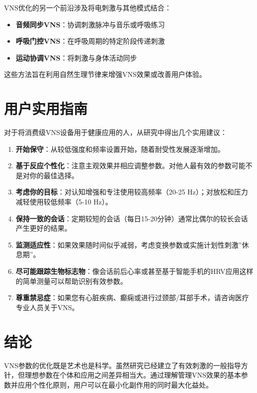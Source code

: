 \documentclass[
  Letterpaper,
]{scrbook}
\providecommand{\tightlist}{%
  \setlength{\itemsep}{0pt}\setlength{\parskip}{0pt}}\usepackage{longtable,booktabs,array}
\begin{document}
VNS优化的另一个前沿涉及将电刺激与其他模式结合：

\begin{itemize}
\tightlist
\item
  \textbf{音频同步VNS}：协调刺激脉冲与音乐或呼吸练习
\item
  \textbf{呼吸门控VNS}：在呼吸周期的特定阶段传递刺激
\item
  \textbf{运动协调VNS}：将刺激与身体活动同步
\end{itemize}

这些方法旨在利用自然生理节律来增强VNS效果或改善用户体验。

\section{用户实用指南}\label{ux7528ux6237ux5b9eux7528ux6307ux5357}

对于将消费级VNS设备用于健康应用的人，从研究中得出几个实用建议：

\begin{enumerate}
\def\labelenumi{\arabic{enumi}.}
\item
  \textbf{开始保守}：从较低强度和频率设置开始，随着耐受性发展逐渐增加。
\item
  \textbf{基于反应个性化}：注意主观效果并相应调整参数。对他人最有效的参数可能不是对你的最佳选择。
\item
  \textbf{考虑你的目标}：对认知增强和专注使用较高频率（20-25
  Hz）；对放松和压力减轻使用较低频率（5-10 Hz）。
\item
  \textbf{保持一致的会话}：定期较短的会话（每日15-20分钟）通常比偶尔的较长会话产生更好的结果。
\item
  \textbf{监测适应性}：如果效果随时间似乎减弱，考虑变换参数或实施计划性刺激''休息期''。
\item
  \textbf{尽可能跟踪生物标志物}：像会话前后心率或甚至基于智能手机的HRV应用这样的简单测量可以帮助识别有效参数。
\item
  \textbf{尊重禁忌症}：如果您有心脏疾病、癫痫或进行过颈部/耳部手术，请咨询医疗专业人员关于VNS。
\end{enumerate}

\section{结论}\label{ux7ed3ux8bba}

VNS参数的优化既是艺术也是科学。虽然研究已经建立了有效刺激的一般指导方针，但理想参数在个体和应用之间差异相当大。通过理解管理VNS效果的基本参数并应用个性化原则，用户可以在最小化副作用的同时最大化益处。
\end{document}
